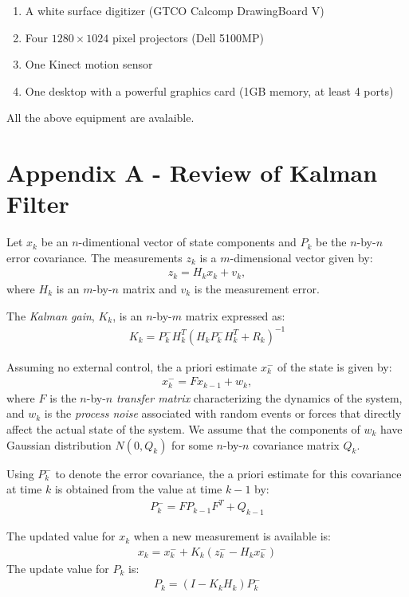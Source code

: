 \begin{enumerate}
  \item A white surface digitizer (GTCO Calcomp DrawingBoard V)
  \item Four $1280\times1024$ pixel projectors (Dell 5100MP)
  \item One Kinect motion sensor
  \item One desktop with a powerful graphics card (1GB memory, at least 4 ports)
\end{enumerate}

All the above equipment are avalaible.

\section{Appendix A - Review of Kalman Filter}
Let $x_k$ be an $n$-dimentional vector of state components and $P_k$ be the
$n$-by-$n$ error covariance. The measurements $z_k$ is a $m$-dimensional
vector given by:
\begin{align*}
z_k = H_kx_k + v_k,
\end{align*}
where $H_k$ is an $m$-by-$n$ matrix and $v_k$ is the measurement error.

The \textit{Kalman gain}, $K_k$, is an $n$-by-$m$ matrix expressed as:
\begin{align*}
K_k = P_k^-H_k^T(H_kP_k^-H_k^T + R_k)^{-1}
\end{align*}

Assuming no external control, the a priori estimate $x_k^-$ of the state is
given by:
\begin{align*}
x_k^- = Fx_{k - 1} + w_k,
\end{align*}
where $F$ is the $n$-by-$n$ \textit{transfer matrix} characterizing the
dynamics of the system, and $w_k$ is the \textit{process noise} associated with
random events or forces that directly affect the actual state of the system. We assume that the components of $w_k$
have Gaussian distribution $N(0, Q_k)$ for some $n$-by-$n$ covariance matrix
$Q_k$.

Using $P_k^-$ to denote the error covariance, the a priori estimate for this
covariance at time $k$ is obtained from the value at time $k - 1$ by:
\begin{align*}
P_k^- = FP_{k - 1}F^T + Q_{k - 1}
\end{align*}

The updated value for $x_k$ when a new measurement is available is:
\begin{align*}
x_k = x_k^- + K_k(z_k^- - H_kx_k^-)
\end{align*}
The update value for $P_k$ is:
\begin{align*}
P_k = (I - K_kH_k)P_k^-
\end{align*}

